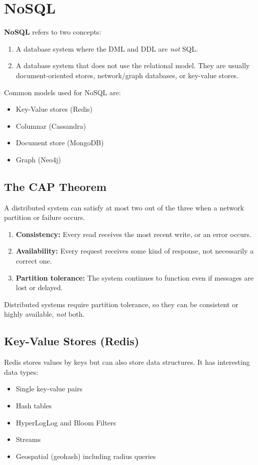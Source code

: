 \documentclass{report}
\newenvironment{definition}[1]{\begin{tcolorbox}[title={Definition: #1}]}{\end{tcolorbox}}
\newenvironment{theorem}[1]{\begin{tcolorbox}[title={Theorem #1}]}{\end{tcolorbox}}
\renewcommand{\bf}[1]{\textbf{{#1}}}
\renewcommand{\it}[1]{\textit{{#1}}}
\begin{document}
\section{NoSQL}
\begin{definition}{NoSQL}
    \bf{NoSQL} refers to two concepts:
    \begin{enumerate}[label=(\arabic*)]
        \item A database system where the DML and DDL are \it{not} SQL.
        \item A database system that does not use the relational model. They are
            usually document-oriented stores, network/graph databases, or
            key-value stores.
    \end{enumerate}
\end{definition}

Common models used for NoSQL are:
\begin{itemize}[label=$\to$]
    \item Key-Value stores (Redis)
    \item Columnar (Cassandra)
    \item Document store (MongoDB)
    \item Graph (Neo4j)
\end{itemize}

\subsection{The CAP Theorem}
\begin{theorem}{(CAP Theorem)}
    A distributed system can satisfy at most two out of the three when a network
    partition or failure occurs.
    \begin{enumerate}[label=(\arabic*)]
        \item \bf{Consistency:} Every read receives the most recent write, or an
            error occurs.
        \item \bf{Availability:} Every request receives some kind of response,
            not necessarily a correct one.
        \item \bf{Partition tolerance:} The system continues to function even if
            messages are lost or delayed.
    \end{enumerate}
\end{theorem}
Distributed systems require partition tolerance, so they can be consistent or
highly available, \it{not} both.

\subsection{Key-Value Stores (Redis)}
Redis stores values by keys but can also store data structures. It has
interesting data types:
\begin{itemize}[label=$\to$]
    \item Single key-value pairs
    \item Hash tables
    \item HyperLogLog and Bloom Filters
    \item Streams
    \item Geospatial (geohash) including radius queries
\end{itemize}
\end{document}

